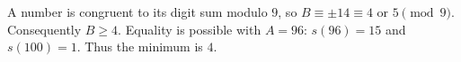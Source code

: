 A number is congruent to its digit sum modulo $9$, so $B\equiv\pm14\equiv4\text{ or }5\pmod9$. Consequently $B\ge4$. Equality is possible with $A=96$: $s(96)=15$ and $s(100)=1$. Thus the minimum is $\boxed4$.
